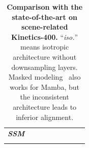 \begin{table}[t]
{\begin{tabular}{l|l|c|l|r|r|r|cc}
             \hline
             \multirow{4}{*}{\textit{\textbf{SSM}}} & \cellcolor{blue!10}{\ModelName-M$_{800e}$} & \cellcolor{blue!10}{\cmark} & \cellcolor{blue!10}{\gray{CLIP-400M}} & \cellcolor{blue!10}{8$\times$224$^2$} & \cellcolor{blue!10}{74} & \cellcolor{blue!10}{101$\times$3$\times$4} & \cellcolor{blue!10}{82.0} & \cellcolor{blue!10}{95.4} \\
             ~ & \cellcolor{blue!10}{\ModelName-M$_{800e}$} & \cellcolor{blue!10}{\cmark} & \cellcolor{blue!10}{\gray{CLIP-400M}} & \cellcolor{blue!10}{16$\times$224$^2$} & \cellcolor{blue!10}{74} & \cellcolor{blue!10}{202$\times$3$\times$4} & \cellcolor{blue!10}{83.4} & \cellcolor{blue!10}{95.9} \\
             ~ & \cellcolor{blue!10}{\ModelName-M$_{800e}$} & \cellcolor{blue!10}{\cmark} & \cellcolor{blue!10}{\gray{CLIP-400M}} & \cellcolor{blue!10}{32$\times$224$^2$} & \cellcolor{blue!10}{74} & \cellcolor{blue!10}{403$\times$3$\times$4} &\cellcolor{blue!10}{83.9} & \cellcolor{blue!10}{96.2} \\
             ~ & \cellcolor{blue!10}{\ModelName-M$_{800e}$} & \cellcolor{blue!10}{\cmark} & \cellcolor{blue!10}{\gray{CLIP-400M}} & \cellcolor{blue!10}{64$\times$384$^2$} & \cellcolor{blue!10}{74} & \cellcolor{blue!10}{2368$\times$3$\times$4} &\cellcolor{blue!10}{\underline{85.0}} & \cellcolor{blue!10}{\underline{96.9}} \\
        \Xhline{1.0pt}	
        \end{tabular}
    }
    \caption{\textbf{Comparison with the state-of-the-art on scene-related Kinetics-400.} 
    ``\textit{iso.}'' means isotropic architecture without downsampling layers.
    Masked modeling~\cite{umt} also works for Mamba,
    but the inconsistent architecture leads to inferior alignment.
    }
    \label{results_k400}
    \vspace{-0.6cm}
\end{table}  
